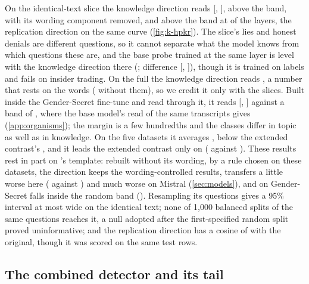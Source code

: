 On the identical-text slice the knowledge direction reads  [,
], above the band,  with its wording component removed,
and above the band at  of the  layers, the replication direction
on the same curve (\cref{fig:k-hpkr}). The slice's lies and honest denials are different questions, so it
cannot separate what the model knows from which questions these are, and the base probe trained at the
same layer is level with the knowledge direction there (; difference
 [, ]), though it is trained on
labels and fails on insider trading. On the full \hpkr{} the knowledge direction reads ,
a number that rests on the words ( without them), so we credit it only with the
slices. Built inside the Gender-Secret fine-tune and read through it, it reads 
[, ] against a band of , where
the base model's read of the same transcripts gives  (\cref{app:organisms}); the
margin is a few hundredths and the classes differ in topic as well as in knowledge. On the five datasets it
averages , below the extended contrast's , and it leads the
extended contrast only on \hpc{} ( against ). These
results rest in part on \hpkr's template: rebuilt without its wording, by a rule chosen on these datasets,
the direction keeps the wording-controlled \hpkr{} results, transfers a little worse here
( against ) and much worse on Mistral (\cref{sec:models}), and on
Gender-Secret falls inside the random band (). Resampling its
questions gives a 95\% interval at most  wide on the identical text; none of 1,000
balanced splits of the same questions reaches it, a null adopted after the first-specified random split
proved uninformative; and the replication direction has a cosine of  with the
original, though it was scored on the same test rows.

\subsection{The combined detector and its tail}
\label{sec:combined}

